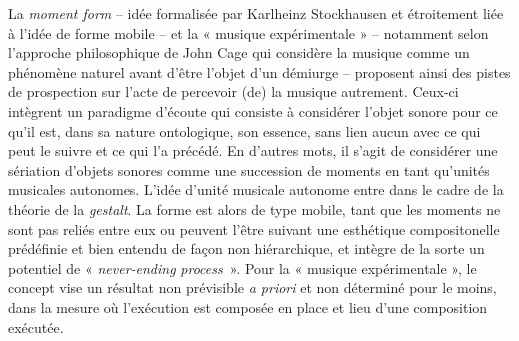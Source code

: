 La \textsl{moment form} 
-- idée formalisée par Karlheinz Stockhausen et étroitement liée à l'idée de forme mobile  -- et la « musique expérimentale » -- notamment selon l'approche philosophique de John Cage qui considère la musique comme un phénomène naturel avant d'être l'objet d'un démiurge -- proposent ainsi des pistes de prospection sur l'acte de percevoir (de) la musique autrement. Ceux-ci intègrent un paradigme d'écoute qui consiste à considérer l'objet sonore pour ce qu'il est, dans sa nature ontologique, son essence, sans lien aucun %
avec ce qui peut le suivre et ce qui l'a précédé. 
En d'autres mots, il s'agit de considérer une sériation d'objets sonores comme une succession de moments en tant qu'unités musicales autonomes.  
L'idée d'unité musicale autonome entre dans le cadre de la théorie de la \textit{gestalt}. 
La forme est alors de type mobile, tant que les moments ne sont pas reliés entre eux ou peuvent l'être suivant une esthétique compositonelle prédéfinie et bien entendu de façon non hiérarchique, et intègre de la sorte un potentiel de « \textit{never-ending} \hbox{\textit{process} »}.
Pour la « musique expérimentale », le concept vise un résultat non prévisible \textit{a priori} et non déterminé pour le moins, dans la mesure où l'exécution est composée en place et lieu d'une composition exécutée. 

\bigskip

